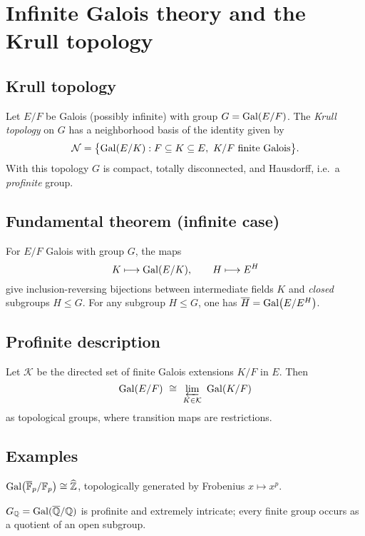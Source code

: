 \section{Infinite Galois theory and the Krull topology}\label{sec:infinite-galois}

\subsection{Krull topology}
\begin{definition}
Let $E/F$ be Galois (possibly infinite) with group $G=\operatorname{Gal}(E/F)$. The \emph{Krull topology} on $G$ has a neighborhood basis of the identity given by
\[
\mathcal{N}=\bigl\{\operatorname{Gal}(E/K): F\subseteq K\subseteq E,\ K/F\ \text{finite Galois}\bigr\}.
\]
With this topology $G$ is compact, totally disconnected, and Hausdorff, i.e.\ a \emph{profinite} group.
\end{definition}

\subsection{Fundamental theorem (infinite case)}
\begin{theorem}
For $E/F$ Galois with group $G$, the maps
\[
K\longmapsto \operatorname{Gal}(E/K),\qquad H\longmapsto E^{H}
\]
give inclusion-reversing bijections between intermediate fields $K$ and \emph{closed} subgroups $H\le G$. For any subgroup $H\le G$, one has $\overline{H}=\operatorname{Gal}\bigl(E/E^{H}\bigr)$.
\end{theorem}

\subsection{Profinite description}
\begin{theorem}
Let $\mathcal{K}$ be the directed set of finite Galois extensions $K/F$ in $E$. Then
\[
\Gal(E/F)\ \cong\ \varprojlim_{K\in\mathcal{K}}\ \Gal(K/F)
\]
as topological groups, where transition maps are restrictions.
\end{theorem}

\subsection{Examples}
\begin{example}
$\operatorname{Gal}\bigl(\overline{\mathbb{F}}_p/\mathbb{F}_p\bigr)\cong\widehat{\mathbb{Z}}$, topologically generated by Frobenius $x\mapsto x^p$.
\end{example}
\begin{example}
$G_{\mathbb{Q}}=\operatorname{Gal}(\overline{\mathbb{Q}}/\mathbb{Q})$ is profinite and extremely intricate; every finite group occurs as a quotient of an open subgroup.
\end{example}

